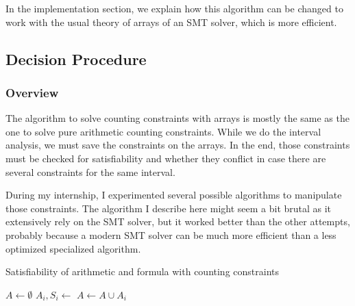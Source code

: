 In the implementation section, we explain
how this algorithm can be changed to work with the usual theory of arrays of an
SMT solver, which is more efficient.

\subsection{Decision Procedure}

\subsubsection{Overview}

The algorithm to solve counting constraints with arrays is mostly the
same as the one to solve pure arithmetic counting constraints. While we do the interval analysis,
we must save the constraints on the arrays. In the end, those constraints must be checked for
satisfiability and whether they conflict in case there are several constraints for the same interval.

During my internship, I experimented several possible algorithms to
manipulate those constraints. The algorithm I describe here might seem a
bit brutal as it extensively rely on the SMT solver, but it
worked better than the other attempts, probably because a modern SMT
solver can be much more efficient than a less optimized specialized
algorithm.

\begin{algorithm}[h]
\caption{Satisfiability of arithmetic and formula with counting constraints}
\begin{algorithmic}[1]
\State {}
    \State {}
    \State $A \gets \emptyset$
        \State $A_i, S_i \gets $ 
        \State $A \gets A \cup A_i$
            \State {}
            \State {}
        \EndIf
    \EndFor
    \State {}
    \State {}
    \State {}
    \State {}
    \State {}
    \State {}
        \State {}
        \State {}
    \EndIf
    \State {}
    \State {}
\EndWhile
\State {}
\end{algorithmic}
\label{arrayalgo}
\end{algorithm}

